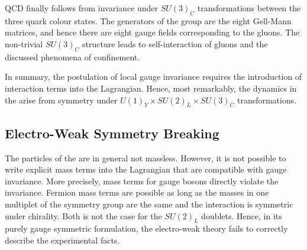 QCD finally follows from invariance under $SU(3)_{C}$ transformations between the three quark colour states.
The generators of the group are the eight Gell-Mann matrices, and hence there are eight gauge fields corresponding to the gluons.
The non-trivial  $SU(3)_{C}$ structure leads to self-interaction of gluons and the discussed phenomena of confinement.

In summary, the postulation of local gauge invariance requires the introduction of interaction terms into the Lagrangian.
Hence, most remarkably, the dynamics in the \sm arise from symmetry under \mbox{$U(1)_{Y}\times SU(2)_{L}\times SU(3)_{C}$} transformations.


\subsection{Electro-Weak Symmetry Breaking}\label{sec:Theory:SM:EWSB}
The particles of the \sm are in general not massless.
However, it is not possible to write explicit mass terms into the Lagrangian that are compatible with gauge invariance.
More precisely, mass terms for gauge bosons directly violate the invariance.
Fermion mass terms are possible as long as the masses in one multiplet of the symmetry group are the same and the interaction is symmetric under chirality.
Both is not the case for the $SU(2)_{L}$ doublets.
Hence, in its purely gauge symmetric formulation, the electro-weak theory fails to correctly describe the experimental facts.

